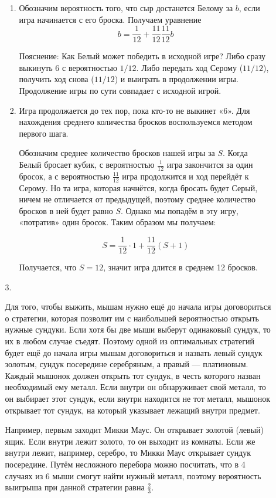 \begin{enumerate}
\begin{enumerate}
\begin{enumerate}
	\item Обозначим вероятность того, что сыр достанется Белому за $b$, если игра начинается с его броска. Получаем уравнение
\[
	b = \frac{1}{12} + \frac{11}{12} \frac{11}{12} b
\]

Пояснение: Как Белый может победить в исходной игре? Либо сразу выкинуть 6 с вероятностью $1/12$. Либо передать ход Серому ($11/12$), получить ход снова ($11/12$) и выиграть в продолжении игры. Продолжение игры по сути совпадает с исходной игрой.

\item Игра продолжается до тех пор, пока кто-то не выкинет «6». Для нахождения среднего количества бросков воспользуемся методом первого шага.

Обозначим среднее количество бросков нашей игры за $S$. Когда Белый бросает кубик, с вероятностью $\frac{1}{12}$ игра закончится за один бросок, а с вероятностью $\frac{11}{12}$ игра продолжится и ход перейдёт к Серому. Но та игра, которая начнётся, когда бросать будет Серый, ничем не отличается от предыдущей, поэтому среднее количество бросков в ней будет равно $S$. Однако мы попадём в эту игру, «потратив» один бросок. Таким образом мы получаем:

\[
S = \frac{1}{12} \cdot 1 + \frac{11}{12}(S +1)
\]

Получается, что $S = 12$, значит игра длится в среднем 12 бросков.
\end{enumerate}

\item[3.]

Для того, чтобы выжить, мышам нужно ещё до начала игры договориться о стратегии, которая позволит им с наибольшей вероятностью открыть нужные сундуки. Если хотя бы две мыши выберут одинаковый сундук, то их в любом случае съедят. Поэтому одной из оптимальных стратегий будет ещё до начала игры мышам договориться и назвать левый сундук золотым, сундук посередине серебряным, а правый — платиновым. Каждый мышонок должен открыть тот сундук, в честь которого назван необходимый ему металл. Если внутри он обнаруживает свой металл, то он выбирает этот сундук, если внутри находится не тот металл, мышонок открывает тот сундук, на который указывает лежащий внутри предмет.

Например, первым заходит Микки Маус. Он открывает золотой (левый) ящик. Если внутри лежит золото, то он выходит из комнаты. Если же внутри лежит, например, серебро, то Микки Маус открывает сундук посередине. Путём несложного перебора можно посчитать, что в 4 случаях из 6 мыши смогут найти нужный металл, поэтому вероятность выигрыша при данной стратегии равна $\frac{2}{3}$.


\end{enumerate}
\end{enumerate}
